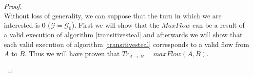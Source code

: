 \documentclass[11pt]{article}
\theoremstyle{definition}
\theoremstyle{corollary}
\theoremstyle{lemma}
\begin{document}
    \begin{proof} \ \\
       Without loss of generality, we can suppose that the turn in which we are interested is 0 ($\mathcal{G} =
       \mathcal{G}_0$). First we will show that the $MaxFlow$ can be a result of a valid execution of algorithm
       \ref{transitivesteal} and afterwards we will show that each valid execution of algorithm \ref{transitivesteal}
       corresponds to a valid flow from $A$ to $B$. Thus we will have proven that $Tr_{A \rightarrow B} = maxFlow(A, B)$.
       \begin{itemize}

\end{itemize}
\end{proof}
\end{document}
